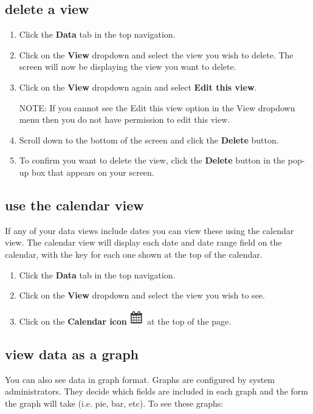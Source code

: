 \documentclass{ctrlo-int-toc}
\begin{document}
\subsection[delete a view]{delete a view}
\begin{enumerate}
\item Click the \textbf{Data} tab in the top navigation.
\item Click on the \textbf{View} dropdown and select the view you wish to delete. The screen will now be displaying the view you want to delete.
\item Click on the \textbf{View} dropdown again and select \textbf{Edit this view}.
\begin{notebox}
NOTE: If you cannot see the Edit this view option in the View dropdown menu then you do not have permission to edit this view. \ 
\end{notebox}

\item Scroll down to the bottom of the screen and click the \textbf{Delete} button.
\item To confirm you want to delete the view, click the \textbf{Delete} button in the pop-up box that appears on your screen. 
\end{enumerate}
\subsection[use the calendar view]{use the calendar view}
If any of your data views include dates you can view these using the calendar view. The calendar view will display each date and date range field on the calendar, with the key for each one shown at the top of the calendar.

\begin{enumerate}
\item Click the \textbf{Data} tab in the top navigation.
\item Click on the \textbf{View} dropdown and select the view you wish to see. 
\item Click on the \textbf{Calendar icon}
\includegraphics[width=0.635cm,height=0.635cm]{userguide-img/userguide-img007.png}
 at the top of the page. 
\end{enumerate}
\subsection[view data as a graph]{view data as a graph}
\label{subsec:viewgraph}
You can also see data in graph format. Graphs are configured by system administrators. They decide which fields are included in each graph and the form the graph will take (i.e. pie, bar, etc). To see these graphs:
\end{document}
